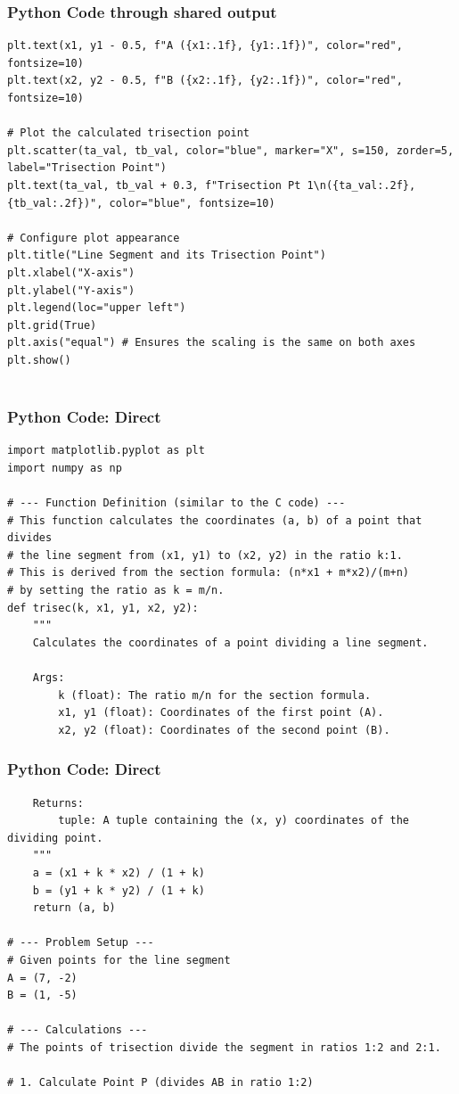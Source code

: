 \documentclass{beamer}
\begin{document}
\begin{frame}[fragile]
\frametitle{Python Code through shared output}
\begin{lstlisting}
plt.text(x1, y1 - 0.5, f"A ({x1:.1f}, {y1:.1f})", color="red", fontsize=10)
plt.text(x2, y2 - 0.5, f"B ({x2:.1f}, {y2:.1f})", color="red", fontsize=10)

# Plot the calculated trisection point
plt.scatter(ta_val, tb_val, color="blue", marker="X", s=150, zorder=5, label="Trisection Point")
plt.text(ta_val, tb_val + 0.3, f"Trisection Pt 1\n({ta_val:.2f}, {tb_val:.2f})", color="blue", fontsize=10)

# Configure plot appearance
plt.title("Line Segment and its Trisection Point")
plt.xlabel("X-axis")
plt.ylabel("Y-axis")
plt.legend(loc="upper left")
plt.grid(True)
plt.axis("equal") # Ensures the scaling is the same on both axes
plt.show()


\end{lstlisting}
\end{frame}

\begin{frame}[fragile]
\frametitle{Python Code: Direct}
\begin{lstlisting}
import matplotlib.pyplot as plt
import numpy as np

# --- Function Definition (similar to the C code) ---
# This function calculates the coordinates (a, b) of a point that divides
# the line segment from (x1, y1) to (x2, y2) in the ratio k:1.
# This is derived from the section formula: (n*x1 + m*x2)/(m+n)
# by setting the ratio as k = m/n.
def trisec(k, x1, y1, x2, y2):
    """
    Calculates the coordinates of a point dividing a line segment.
    
    Args:
        k (float): The ratio m/n for the section formula.
        x1, y1 (float): Coordinates of the first point (A).
        x2, y2 (float): Coordinates of the second point (B).
\end{lstlisting}
\end{frame}

\begin{frame}[fragile]
\frametitle{Python Code: Direct}
\begin{lstlisting}
    Returns:
        tuple: A tuple containing the (x, y) coordinates of the dividing point.
    """
    a = (x1 + k * x2) / (1 + k)
    b = (y1 + k * y2) / (1 + k)
    return (a, b)

# --- Problem Setup ---
# Given points for the line segment
A = (7, -2)
B = (1, -5)

# --- Calculations ---
# The points of trisection divide the segment in ratios 1:2 and 2:1.

# 1. Calculate Point P (divides AB in ratio 1:2)
\end{lstlisting}
\end{frame}
\end{document}
